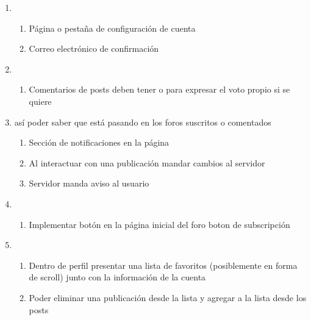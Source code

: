 \documentclass[12pt, letterpaper, notitlepage]{article}
\begin{document}
\begin{enumerate}
        \item {}
        \begin{enumerate}
            \item Página o pestaña de configuración de cuenta
            \item Correo electrónico de confirmación
        \end{enumerate}

        \item {}
        \begin{enumerate}
            \item Comentarios de posts deben tener  o  para expresar el voto propio si se quiere
        \end{enumerate}

        \item {}
        {así poder saber que está pasando en los foros suscritos o comentados}
        \begin{enumerate}
            \item Sección de notificaciones en la página
            \item Al interactuar con una publicación mandar cambios al servidor
            \item Servidor manda aviso al usuario
        \end{enumerate}

        \item {}
        \begin{enumerate}
            \item Implementar botón en la página inicial del foro boton de subscripción
        \end{enumerate}

        \item {}
        \begin{enumerate}
            \item Dentro de perfil presentar una lista de favoritos (posiblemente en forma de scroll) junto con la información de la cuenta
            \item Poder eliminar una publicación desde la lista y agregar a la lista desde los posts
        \end{enumerate}



\end{enumerate}
\end{document}
